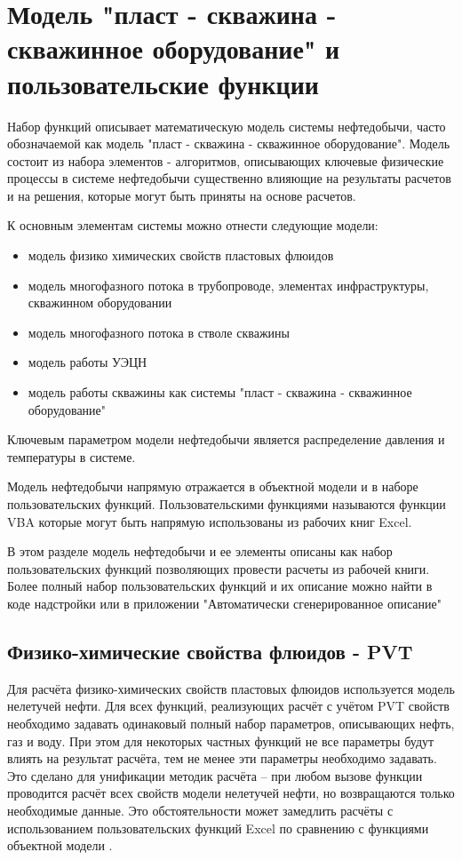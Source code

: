 \chapter{Модель "пласт - скважина - скважинное оборудование" и пользовательские функции \unf{}}
Набор функций \unf{} описывает математическую модель системы нефтедобычи, часто обозначаемой как модель "пласт - скважина - скважинное оборудование". Модель состоит из набора элементов - алгоритмов, описывающих ключевые физические процессы в системе нефтедобычи существенно влияющие на результаты расчетов и на решения, которые могут быть приняты на основе расчетов.

К основным элементам системы можно отнести следующие модели:
\begin{itemize}
	\item модель физико химических свойств пластовых флюидов
	\item модель многофазного потока в трубопроводе, элементах инфраструктуры, скважинном оборудовании
	\item модель многофазного потока в стволе скважины
	\item модель работы УЭЦН
	\item модель работы скважины как системы "пласт - скважина - скважинное оборудование"
\end{itemize}

Ключевым параметром модели нефтедобычи является распределение давления и температуры в системе. 

Модель нефтедобычи напрямую отражается в объектной модели \unf{} и в наборе пользовательских функций. Пользовательскими функциями называются функции VBA которые могут быть напрямую использованы из рабочих книг Excel. 

В этом разделе модель нефтедобычи и ее элементы описаны как набор пользовательских функций позволяющих провести расчеты из рабочей книги. Более полный набор пользовательских функций и их описание можно найти в коде надстройки или в приложении "Автоматически сгенерированное описание"

\section{Физико-химические свойства флюидов - PVT}
Для расчёта физико-химических свойств пластовых флюидов используется модель нелетучей нефти. Для всех функций, реализующих расчёт с учётом PVT свойств необходимо задавать одинаковый полный набор параметров, описывающих нефть, газ и воду.  При этом для некоторых частных функций не все параметры будут влиять на результат расчёта, тем не менее эти параметры необходимо задавать. Это сделано для унификации методик расчёта – при любом вызове функции проводится расчёт всех свойств модели нелетучей нефти, но возвращаются только необходимые данные. Это обстоятельности может замедлить расчёты с использованием пользовательских функций Excel по сравнению с функциями объектной модели \unf{}.
 

